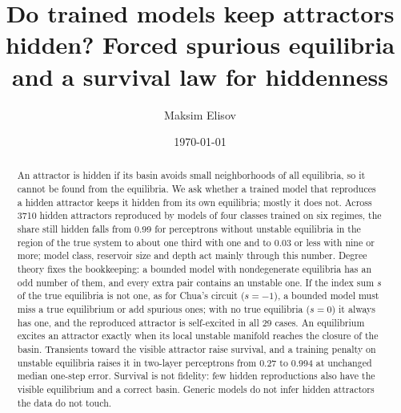 \title[Do trained models keep attractors hidden?]{Do trained models keep attractors hidden? Forced spurious equilibria and a survival law for hiddenness}

\author{Maksim Elisov}

\date{\today}

\begin{abstract}
An attractor is hidden if its basin avoids small neighborhoods of all equilibria, so it cannot be found from the
equilibria. We ask whether a trained model that reproduces a hidden attractor keeps it hidden from its own
equilibria; mostly it does not. Across 3710 hidden attractors reproduced by models of four classes trained on
six regimes, the share still hidden falls from 0.99 for perceptrons without unstable equilibria in the region of the true
system to about one third with one and to 0.03 or less with nine or more; model class, reservoir size and depth act mainly
through this number. Degree theory fixes the bookkeeping: a bounded model with nondegenerate equilibria has an odd
number of them, and every extra pair contains an unstable one. If the
index sum $s$ of the true equilibria is not one, as for Chua's circuit ($s=-1$), a bounded model must miss a true
equilibrium or add spurious ones; with no true equilibria ($s=0$) it always has one, and the reproduced attractor is
self-excited in all 29 cases. An equilibrium excites an attractor exactly when its local unstable manifold reaches the
closure of the basin. Transients toward the visible attractor raise survival, and a training penalty on unstable
equilibria raises it in two-layer perceptrons from 0.27 to 0.994 at unchanged median one-step error. Survival is not
fidelity: few hidden reproductions also have the visible equilibrium and a correct basin. Generic models do not infer
hidden attractors the data do not touch.
\end{abstract}

\maketitle

